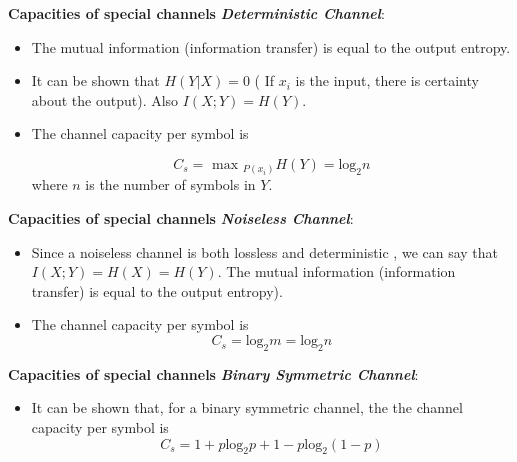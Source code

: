 
\noindent \textbf{Capacities of special channels}
\textbf{\emph{Deterministic Channel}}:
\begin{itemize}
\item The mutual information (information transfer) is equal to the output entropy.
\item It can be shown that $H(Y|X) = 0$ ( If $x_i$ is the input, there is certainty about the output). Also $I(X;Y) = H(Y)$.
\item  The channel capacity per symbol is

\[ C_s = \mbox{ max }_{P(x_i)} H(Y) = \mbox{log}_2n \]
where $n$ is the number of symbols in $Y$.
\end{itemize}


\noindent \textbf{Capacities of special channels}
 \textbf{\emph{Noiseless Channel}}:
\begin{itemize}
\item Since a noiseless channel is both lossless and deterministic , we can say that $I(X;Y) = H(X) = H(Y)$.
The mutual information (information transfer) is equal to the output entropy). \item The channel capacity per symbol is
\[ C_s = \mbox{log}_2m = \mbox{log}_2n \]
\end{itemize}



\noindent \textbf{Capacities of special channels}
 \textbf{\emph{Binary Symmetric Channel}}:
\begin{itemize}
\item It can be shown that, for a binary symmetric channel, the the channel capacity per symbol is
\[ C_s = 1 + p\mbox{log}_2p  + 1-p\mbox{log}_2 (1-p)  \]
\end{itemize}


